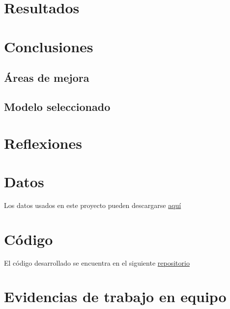 \documentclass[journal]{IEEEtran}                                                          %
\begin{document}
    \section{Resultados} \label{resultados}

    \section{Conclusiones} \label{conclusiones}
        
        \subsection{Áreas de mejora} \label{improvements}

        \subsection{Modelo seleccionado} \label{selected-model}

    \section{Reflexiones} \label{thoughts}
    
    \appendices
    
    \section{Datos}
        Los datos usados en este proyecto pueden descargarse \href{https://www.kaggle.com/code/ravaliraj/risk-classification-of-cervical-cancer}{aquí}

    \section{Código}
        El código desarrollado se encuentra en el siguiente \href{https://github.com/JuanEcheagaray75/cancer-clf}{repositorio}
    \section{Evidencias de trabajo en equipo}
    
    
\end{document}
